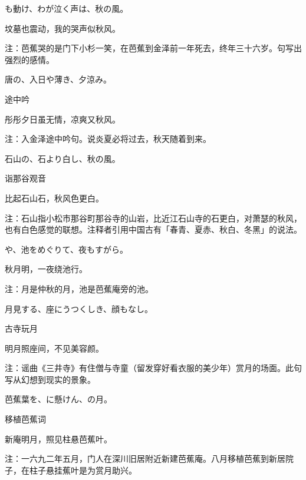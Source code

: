\begin{haiku}
    {\FH {}も動け、わが泣く声は、秋の風。}

    {\FK 坟墓也震动，我的哭声似秋风。}

    {\FT 注：芭蕉哭的是门下小杉一笑，在芭蕉到金泽前一年死去，终年三十六岁。句写出强烈的感情。}
\end{haiku}

\begin{haiku}
    {\FH 唐の、入日や薄き、夕涼み。}

    {\FK 途中吟}

    {\FK 彤彤夕日虽无情，凉爽又秋风。}

    {\FT 注：入金泽途中吟句。说炎夏必将过去，秋天随着到来。}
\end{haiku}

\begin{haiku}
    {\FH 石山の、石より白し、秋の風。}

    {\FK 诣那谷观音}

    {\FK 比起石山石，秋风色更白。}

    {\FT 注：石山指小松市那谷町那谷寺的山岩，比近江石山寺的石更白，对萧瑟的秋风，也有白色感觉的联想。注释者引用中国古有「春青、夏赤、秋白、冬黑」的说法。}
\end{haiku}

\begin{haiku}
    {\FH {}や、池をめぐりて、夜もすがら。}

    {\FK 秋月明，一夜绕池行。}

    {\FT 注：月是仲秋的月，池是芭蕉庵旁的池。}
\end{haiku}

\begin{haiku}
    {\FH 月見する、座にうつくしき、顔もなし。}

    {\FK 古寺玩月}

    {\FK 明月照座间，不见美容颜。}

    {\FT 注：谣曲《三井寺》有住僧与寺童（留发穿好看衣服的美少年）赏月的场面。此句写从幻想到现实的景象。}
\end{haiku}

\begin{haiku}
    {\FH 芭蕉葉を、に懸けん、の月。}

    {\FK 移植芭蕉词}

    {\FK 新庵明月，照见柱悬芭蕉叶。}

    {\FT 注：一六九二年五月，门人在深川旧居附近新建芭蕉庵。八月移植芭蕉到新居院子，在柱子悬挂蕉叶是为赏月助兴。}
\end{haiku}

